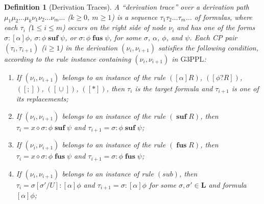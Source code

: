 \documentclass[manuscript,screen]{acmart}
\newtheorem{definition}{Definition}[section]
\newcommand{\bff}[1]{\mathbf{#1}}
\newcommand{\Conf}[0]{\bff{L}}
\DeclareMathOperator{\seq}{;}
\DeclareMathOperator{\cho}{\cup}
\newcommand{\Sub}[0]{{\textit{sub}}}
\newcommand{\lup}[0]{*}
\newcommand{\cat}[0]{\diamond}
\newcommand{\GiiiPPLcyc}[0]{\mbox{G3PPL}}
\DeclareMathOperator{\osuf}{\mathbf{suf}}
\DeclareMathOperator{\ofus}{\mathbf{fus}}
\begin{document}
\begin{definition}[Derivation Traces]
\label{def:Derivation Traces}
A ``derivation trace'' over a derivation path $\mu_1\mu_2\ldots\mu_k\nu_1\nu_2\ldots\nu_m\ldots$ ($k \ge 0$, $m\ge 1$) is a sequence $\tau_1\tau_2\ldots\tau_m\ldots$ of formulas, where each $\tau_i$ ($1\le i\le m$) occurs on the right side of node $\nu_i$ and has one of the forms $\sigma : [\alpha]\phi$, $\sigma : \phi\osuf\psi$, or $\sigma : \phi\ofus\psi$, for some $\sigma$, $\alpha$, $\phi$, and $\psi$. 
Each CP pair $(\tau_i, \tau_{i+1})$ ($i\ge 1$) in the derivation $(\nu_i, \nu_{i+1})$ satisfies the following condition, according to the rule instance containing $(\nu_i, \nu_{i+1})$ in $\GiiiPPLcyc$: 
    \begin{enumerate}
        \item If $(\nu_i, \nu_{i+1})$ belongs to  an instance of the rule $([\alpha]R)$, $([\phi?R])$, $([\seq])$, $([\cho])$, $([\lup])$, then $\tau_i$ is the target formula and $\tau_{i+1}$ is one of its replacements; 
        
        
        \item If $(\nu_i, \nu_{i+1})$ belongs to an instance of the rule $(\osuf R)$, then $\tau_i =  x\cat \sigma : \phi\osuf \psi$ and $\tau_{i+1}=\sigma : \phi\osuf\psi$; 
        
        \item If $(\nu_i, \nu_{i+1})$ belongs to an instance of the rule $(\ofus R)$, then $\tau_i =  x\cat \sigma : \phi\ofus \psi$ and $\tau_{i+1}=\sigma : \phi\ofus\psi$; 
        


        \item If $(\nu_i, \nu_{i+1})$ belongs to an instance of rule $(\Sub)$, 
        then 
        $\tau_i = \sigma[\sigma'/U] : [\alpha]\phi$ and $\tau_{i+1} = \sigma : [\alpha]\phi$ for some $\sigma, \sigma'\in \Conf$ and formula $[\alpha]\phi$;


\end{enumerate}
\end{definition}
\end{document}
